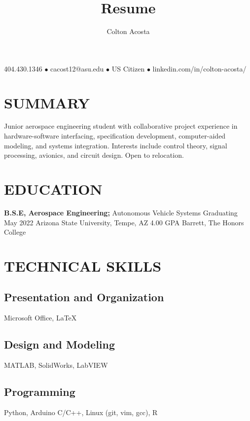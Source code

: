 \documentclass{article}
\makeatletter
\renewcommand{\maketitle}{
	\begin{center}
		{\huge\bfseries
			\theauthor}
			
		404.430.1346 $\bullet$ cacost12@asu.edu $\bullet$ US Citizen $\bullet$ linkedin.com/in/colton-acosta/
	\end{center}
}
\makeatother
\begin{document}
\title{Resume}
\author{Colton Acosta}
\maketitle
\section{SUMMARY}
Junior aerospace engineering student with collaborative project experience in hardware-software interfacing, specification development, computer-aided modeling, and systems integration. Interests include control theory, signal processing, avionics, and circuit design. Open to relocation. 
\section{EDUCATION}
\textbf{B.S.E, Aerospace Engineering;} Autonomous Vehicle Systems
\hfill 
Graduating May 2022
\linebreak
Arizona State University, Tempe, AZ 
\hfill
4.00 GPA
\linebreak
Barrett, The Honors College

\section{TECHNICAL SKILLS}
\subsection{Presentation and Organization}
Microsoft Office,  {\LaTeX}
\subsection{Design and Modeling}
MATLAB, SolidWorks, LabVIEW
\subsection{Programming} 
Python, Arduino C/C++, Linux (git, vim, gcc), R
\end{document}
